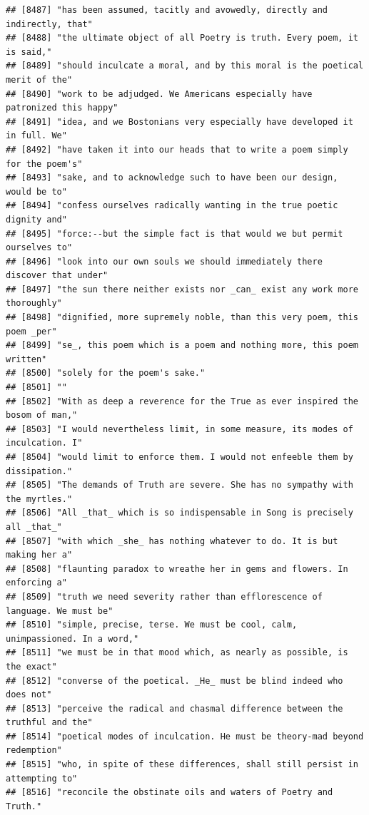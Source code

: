 \documentclass{article}\usepackage[]{graphicx}\usepackage[]{color}
\makeatletter
\newenvironment{kframe}{%
 \def\at@end@of@kframe{}%
 \ifinner\ifhmode%
  \def\at@end@of@kframe{\end{minipage}}%
  \begin{minipage}{\columnwidth}%
 \fi\fi%
 \def\FrameCommand##1{\hskip\@totalleftmargin \hskip-\fboxsep
 \colorbox{shadecolor}{##1}\hskip-\fboxsep
     \hskip-\linewidth \hskip-\@totalleftmargin \hskip\columnwidth}%
 \MakeFramed {\advance\hsize-\width
   \@totalleftmargin\z@ \linewidth\hsize
   \@setminipage}}%
 {\par\unskip\endMakeFramed%
 \at@end@of@kframe}
\newenvironment{knitrout}{}{} %
\makeatother
\begin{document}
\begin{knitrout}
\begin{kframe}
\begin{verbatim}
## [8487] "has been assumed, tacitly and avowedly, directly and indirectly, that"       
## [8488] "the ultimate object of all Poetry is truth. Every poem, it is said,"         
## [8489] "should inculcate a moral, and by this moral is the poetical merit of the"    
## [8490] "work to be adjudged. We Americans especially have patronized this happy"     
## [8491] "idea, and we Bostonians very especially have developed it in full. We"       
## [8492] "have taken it into our heads that to write a poem simply for the poem's"     
## [8493] "sake, and to acknowledge such to have been our design, would be to"          
## [8494] "confess ourselves radically wanting in the true poetic dignity and"          
## [8495] "force:--but the simple fact is that would we but permit ourselves to"        
## [8496] "look into our own souls we should immediately there discover that under"     
## [8497] "the sun there neither exists nor _can_ exist any work more thoroughly"       
## [8498] "dignified, more supremely noble, than this very poem, this poem _per"        
## [8499] "se_, this poem which is a poem and nothing more, this poem written"          
## [8500] "solely for the poem's sake."                                                 
## [8501] ""                                                                            
## [8502] "With as deep a reverence for the True as ever inspired the bosom of man,"    
## [8503] "I would nevertheless limit, in some measure, its modes of inculcation. I"    
## [8504] "would limit to enforce them. I would not enfeeble them by dissipation."      
## [8505] "The demands of Truth are severe. She has no sympathy with the myrtles."      
## [8506] "All _that_ which is so indispensable in Song is precisely all _that_"        
## [8507] "with which _she_ has nothing whatever to do. It is but making her a"         
## [8508] "flaunting paradox to wreathe her in gems and flowers. In enforcing a"        
## [8509] "truth we need severity rather than efflorescence of language. We must be"    
## [8510] "simple, precise, terse. We must be cool, calm, unimpassioned. In a word,"    
## [8511] "we must be in that mood which, as nearly as possible, is the exact"          
## [8512] "converse of the poetical. _He_ must be blind indeed who does not"            
## [8513] "perceive the radical and chasmal difference between the truthful and the"    
## [8514] "poetical modes of inculcation. He must be theory-mad beyond redemption"      
## [8515] "who, in spite of these differences, shall still persist in attempting to"    
## [8516] "reconcile the obstinate oils and waters of Poetry and Truth."                

\end{verbatim}
\end{kframe}
\end{knitrout}
\end{document}
